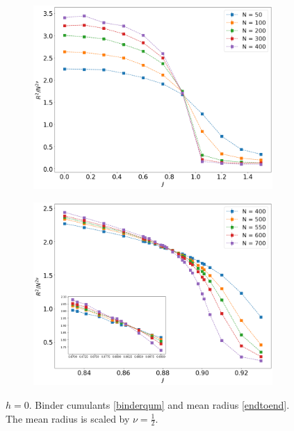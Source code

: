 \begin{figure}[H]
\begin{subfigure}[b]{0.45\textwidth}
		\caption{  }
		\label{fig:bcshort_longbc_3}
	\end{subfigure}
	\begin{subfigure}[b]{0.45\textwidth}
		\includegraphics[width=\textwidth]{Images/3_rscaling_shortchains.png}
		\caption{  }
		\label{fig:bcshort_shortradius_3}
	\end{subfigure}
	\begin{subfigure}[b]{0.45\textwidth}
		\includegraphics[width=\textwidth]{Images/3_rscaling_longchains.png}
		\caption{  }
		\label{fig:bcshort_longradius_3}
	\end{subfigure}
	\caption{$h=0$. Binder  cumulants \eqref{binderqum} and mean radius \eqref{endtoend}. The mean radius is scaled by $\nu = \frac{1}{2}$.   }
	\label{fig:bcshort_3D}
\end{figure}

